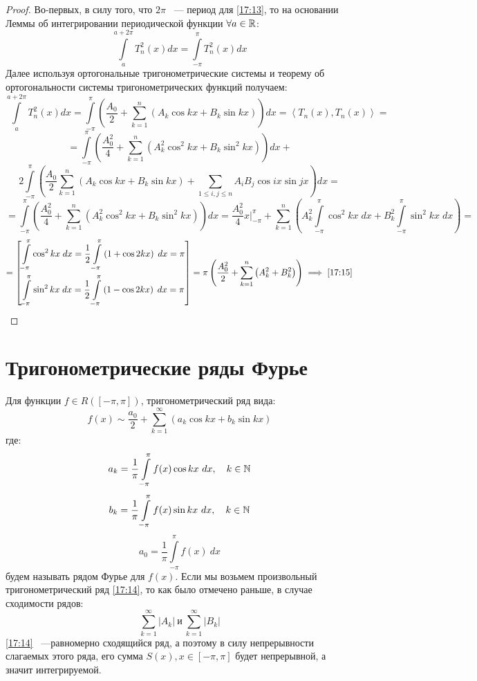 \documentclass[../../main.tex]{subfiles}
\begin{document}
\begin{proof}
	Во-первых, в силу того, что $2\pi$ ~--- период для \eqref{17:13}, то на основании Леммы об интегрировании периодической функции $\forall a \in \mathbb{R}$:
	\[  \int\limits_{a}^{a+2\pi} T_n^2(x)dx = \int\limits_{-\pi}^{\pi} T_n^2(x)dx      \]
	Далее используя ортогональные тригонометрические системы и теорему об ортогональности системы тригонометрических функций получаем:
	\[  \int\limits_{a}^{a+2\pi} T_n^2(x)dx = \int\limits_{-\pi}^{\pi} \left( \frac{A_0}{2} + \sum_{k=1}^{n} \left( A_k \cos{kx} + B_k \sin{kx}\right) \right) dx  = \left< T_n(x), T_n(x) \right> =     \]
	\[  = \int\limits_{-\pi}^{\pi} \left( \frac{A_0^2}{4} + \sum_{k=1}^{n} \left( A_k^2 \cos^2{kx} + B_k \sin^2{kx}\right) \right) dx +       \]
	\[ 2 \int\limits_{-\pi}^{\pi} \left( \frac{A_0}{2} \sum_{k=1}^{n} \left( A_k \cos{kx} + B_k \sin{kx}\right) + \sum_{1 \le i,j \le n} A_i B_j \cos{ix} \sin{jx}  \right) dx =   \]
	\[ = \int\limits_{-\pi}^{\pi} \left( \frac{A_0^2}{4} + \sum_{k=1}^{n} \left( A_k^2 \cos^2{kx} + B_k \sin^2{kx}\right) \right) dx = \frac{A_0^2}{4} x\big|_{-\pi}^{\pi} + \sum_{k=1}^{n} \left( A_k^2 \int\limits_{-\pi}^{\pi} \cos^2{kx} \; dx  + B_k^2 \int\limits_{-\pi}^{\pi} \sin^2{kx} \; dx \right) =  \]
	\[  = \left[ \begin{gathered} 
	\int\limits_{-\pi}^{\pi} \cos^2{kx} \; dx = \frac{1}{2} \int\limits_{-\pi}^{\pi} \left( 1 + \cos{2kx} \right)  \; dx = \pi	\\
	\int\limits_{-\pi}^{\pi} \sin^2{kx} \; dx = \frac{1}{2} \int\limits_{-\pi}^{\pi} \left( 1 - \cos{2kx} \right)  \; dx = \pi
	\end{gathered}\right]  = \pi \left( \frac{A_0^2}{2} + \sum_{k=1}^{n} \left( A_k^2 + B_k^2 \right) \right) \implies \eqref{17:15}  \qedhere  \]
\end{proof}		

\section{Тригонометрические ряды Фурье}
Для функции $f \in R\left( [-\pi,\pi]\right)$, тригонометрический ряд вида:
\begin{equation}
\label{17:16}
f(x) \sim \frac{a_0}{2} + \sum_{k=1}^{\infty}  \left( a_k \cos{kx} + b_k \sin{kx}\right)
\end{equation}
где:
\begin{equation}
\label{17:17}
a_k = \frac{1}{\pi} \int\limits_{-\pi}^{\pi} f(x)\cos{kx} \ dx, \quad k \in \mathbb{N}
\end{equation}
\begin{equation}
\label{17:18}
b_k = \frac{1}{\pi} \int\limits_{-\pi}^{\pi} f(x)\sin{kx} \ dx, \quad k \in \mathbb{N}
\end{equation}
\[ a_0 = \frac{1}{\pi} \int\limits_{-\pi}^{\pi} f(x) \ dx \]
будем называть рядом Фурье для $f(x)$. Если мы возьмем произвольный тригонометрический ряд \eqref{17:14}, то как было отмечено раньше, в случае сходимости рядов:
\[ \sum_{k=1}^{\infty} \left| A_k \right| \ \text{и} \ \sum_{k=1}^{\infty} \left| B_k \right|    \]
\eqref{17:14} ~---равномерно сходящийся ряд, а поэтому в силу непрерывности слагаемых этого ряда, его сумма $S(x), x\in\left[ -\pi,\pi \right] $ будет непрерывной, а значит интегрируемой.
\end{document}
